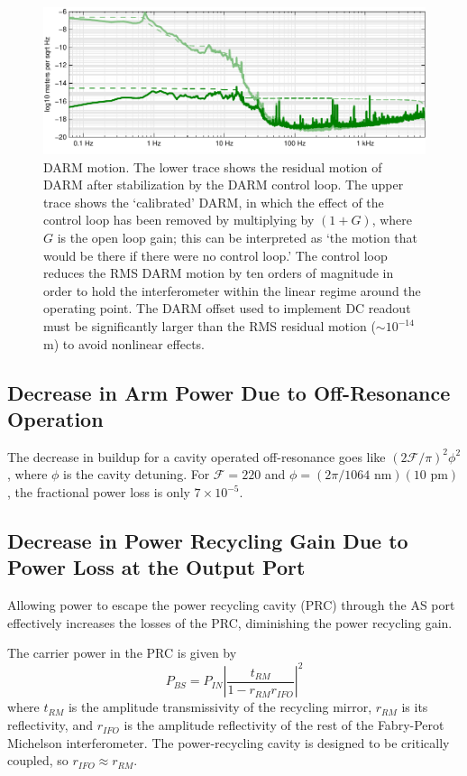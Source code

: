 \begin{figure}[p]
\centerline{\includegraphics[width=\columnwidth]{figures/residualDARM.pdf}}
\caption[Residual DARM motion]{\label{fig:residual-DARM}DARM
  motion. The lower trace shows the residual motion of DARM after
  stabilization by the DARM control loop.  The upper trace shows the
  `calibrated' DARM, in which the effect of the control loop has been
  removed by multiplying by $(1+G)$, where $G$ is the open loop gain;
  this can be interpreted as `the motion that would be there if there
  were no control loop.'  The control loop reduces the RMS DARM motion
  by ten orders of magnitude in order to hold the interferometer
  within the linear regime around the operating point.  The DARM
  offset used to implement DC readout must be significantly larger
  than the RMS residual motion ($\sim10^{-14}$ m) to avoid
  nonlinear effects.}
\end{figure}


\subsection{Decrease in Arm Power Due to Off-Resonance Operation}
The decrease in buildup for a cavity operated off-resonance goes like
$(2\mathcal{F}/\pi)^2\phi^2$, where $\phi$ is the cavity detuning.
For $\mathcal{F}=220$ and $\phi=(2\pi/1064\text{ nm})(10\text{ pm})$,
the fractional power loss is only $7\times10^{-5}$.

\subsection{Decrease in Power Recycling Gain Due to Power Loss at the Output Port}

Allowing power to escape the power recycling cavity (PRC) through the
AS port effectively increases the losses of the PRC, diminishing the
power recycling gain.

The carrier power in the PRC is given by
\begin{equation}
P_{BS} = P_{IN}\left| \frac{t_{RM}}{1 - r_{RM} r_{IFO}}\right|^2
\end{equation}
where $t_{RM}$ is the amplitude transmissivity of the recycling
mirror, $r_{RM}$ is its reflectivity, and $r_{IFO}$ is the amplitude
reflectivity of the rest of the Fabry-Perot Michelson interferometer.
The power-recycling cavity is designed to be critically coupled, so
$r_{IFO}\approx r_{RM}$.

